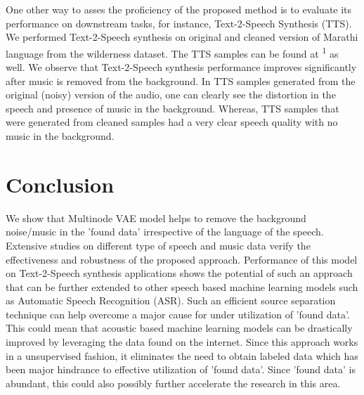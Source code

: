 One other way to asses the proficiency of the proposed method is to evaluate its performance on downstream tasks, for instance, Text-2-Speech Synthesis (TTS). We performed Text-2-Speech synthesis on original and cleaned version of Marathi language from the wilderness dataset. 
The TTS samples can be found at \textsuperscript{\rm 1} as well.
We observe that Text-2-Speech synthesis performance improves significantly after music is removed from the background. In TTS samples generated from the original (noisy) version of the audio, one can clearly see the distortion in the speech and presence of music in the background. Whereas, TTS samples that were generated from cleaned samples had a very clear speech quality with no music in the background. 





\section{Conclusion}
We show that Multinode VAE model helps to remove the background noise/music in the 'found data' irrespective of the language of the speech. Extensive studies on different type of speech and music data verify the effectiveness and robustness of the proposed approach. Performance of this model on Text-2-Speech synthesis applications shows the potential of such an approach that can be further extended to other speech based machine learning models such as Automatic Speech Recognition (ASR). Such an efficient source separation technique can help overcome a major cause for under utilization of 'found data'. This could mean that acoustic based machine learning models can be drastically improved by leveraging the data found on the internet. Since this approach works in a unsupervised fashion, it eliminates the need to obtain labeled data which has been major hindrance to effective utilization of 'found data'. Since 'found data' is abundant, this could also possibly further accelerate the research in this area. 

